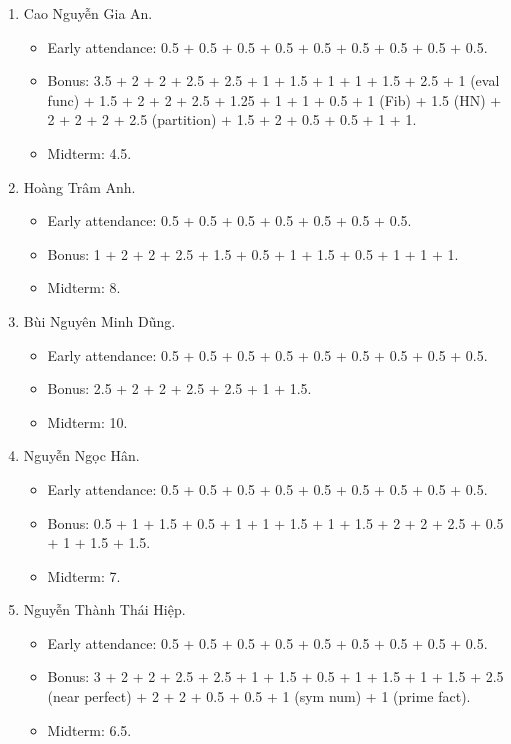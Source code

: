 \documentclass{article}
\begin{document}
\begin{enumerate}
	\item {\sc Cao Nguyễn Gia An.}
	\begin{itemize}
		\item Early attendance: 0.5 + 0.5 + 0.5 + 0.5 + 0.5 + 0.5 + 0.5 + 0.5 + 0.5.
		\item Bonus: 3.5 + 2 + 2 + 2.5 + 2.5 + 1 + 1.5 + 1 + 1 + 1.5 + 2.5 + 1 (eval func) + 1.5 + 2 + 2 + 2.5 + 1.25 + 1 + 1 + 0.5 + 1 (Fib) + 1.5 (HN) + 2 + 2 + 2 + 2.5 (partition) + 1.5 + 2 + 0.5 + 0.5 + 1 + 1.
        \item Midterm: 4.5.
	\end{itemize}
	\item {\sc Hoàng Trâm Anh.}
	\begin{itemize}
		\item Early attendance: 0.5 + 0.5 + 0.5 + 0.5 + 0.5 + 0.5 + 0.5.
		\item Bonus: 1 + 2 + 2 + 2.5 + 1.5 + 0.5 + 1 + 1.5 + 0.5 + 1 + 1 + 1.
        \item Midterm: 8.
	\end{itemize}
	\item {\sc Bùi Nguyên Minh Dũng.}
	\begin{itemize}
		\item Early attendance: 0.5 + 0.5 + 0.5 + 0.5 + 0.5 + 0.5 + 0.5 + 0.5 + 0.5.
		\item Bonus: 2.5 + 2 + 2 + 2.5 + 2.5 + 1 + 1.5.
        \item Midterm: 10.
	\end{itemize}
	\item {\sc Nguyễn Ngọc Hân.}
	\begin{itemize}
		\item Early attendance: 0.5 + 0.5 + 0.5 + 0.5 + 0.5 + 0.5 + 0.5 + 0.5 + 0.5.
		\item Bonus: 0.5 + 1 + 1.5 + 0.5 + 1 + 1 + 1.5 + 1 + 1.5 + 2 + 2 + 2.5 + 0.5 + 1 + 1.5 + 1.5.
        \item Midterm: 7.
	\end{itemize}
	\item {\sc Nguyễn Thành Thái Hiệp.}
	\begin{itemize}
		\item Early attendance: 0.5 + 0.5 + 0.5 + 0.5 + 0.5 + 0.5 + 0.5 + 0.5 + 0.5.
		\item Bonus: 3 + 2 + 2 + 2.5 + 2.5 + 1 + 1.5 + 0.5 + 1 + 1.5 + 1 + 1.5 + 2.5 (near perfect) + 2 + 2 + 0.5 + 0.5 + 1 (sym num) + 1 (prime fact).
        \item Midterm: 6.5.

\end{itemize}
\end{enumerate}
\end{document}

